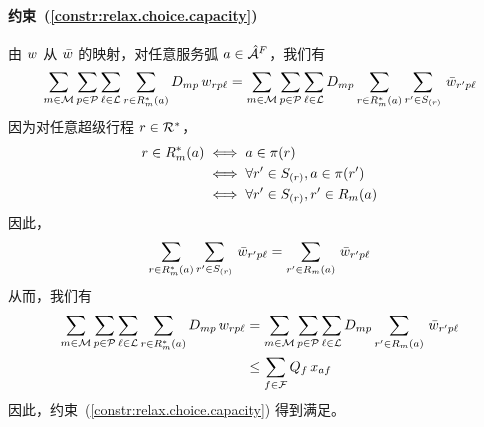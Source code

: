 \paragraph*{约束~(\ref{constr:relax.choice.capacity})} 由 $w$ 从 $\bar{w}$ 的映射，对任意服务弧 $a \in {\hat{\mathcal{A}}^F_{{}}}$，我们有
\begin{equation*}
    \sum_{m\in \mathcal{M}}\sum_{p\in \mathcal{P}}\sum_{\ell\in \mathcal{L}}\sum_{r\in R^{*}_{m}(a)} 
    D_{mp}\, w_{rp\ell} 
    = \sum_{m\in \mathcal{M}}\sum_{p\in \mathcal{P}}\sum_{\ell\in \mathcal{L}} 
    D_{mp} \sum_{r\in R^{*}_{m}(a)} \sum_{r' \in S_{(r)}}\, \bar{w}_{r'p\ell}
\end{equation*}
因为对任意超级行程 $r \in \mathcal{R}^{*}$，
\begin{equation*}
\begin{aligned}
    r\in R^{*}_{m}(a)
    & \iff a \in \pi({r}) \\
    & \iff \forall r' \in S_{(r)}, a \in \pi({r'}) \\
    & \iff \forall r' \in S_{(r)}, r' \in R_{m}(a)
\end{aligned}
\end{equation*}
因此，
\[
    \sum_{r\in R^{*}_{m}(a)} \sum_{r' \in S_{(r)}}\, \bar{w}_{r'p\ell} = \sum_{r' \in R_{m}(a)} \, \bar{w}_{r'p\ell}
\]
从而，我们有
\begin{equation*}
\begin{aligned}
    \sum_{m\in \mathcal{M}}\sum_{p\in \mathcal{P}}\sum_{\ell\in \mathcal{L}}\sum_{r\in R^{*}_{m}(a)} 
    D_{mp}\, w_{rp\ell} 
    & = \sum_{m\in \mathcal{M}}\sum_{p\in \mathcal{P}}\sum_{\ell\in \mathcal{L}} 
    D_{mp} \sum_{r' \in R_{m}(a)}\, \bar{w}_{r'p\ell} \\
    & \le \sum_{f\in \mathcal{F}} Q_{f}\, x_{af}
\end{aligned}
\end{equation*}
因此，约束~(\ref{constr:relax.choice.capacity}) 得到满足。
